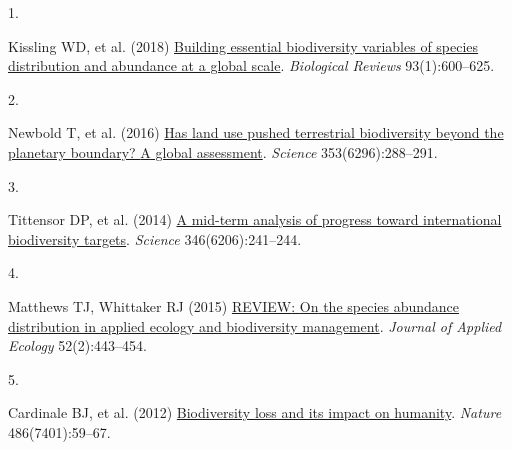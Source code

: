 \documentclass[9pt,twocolumn,twoside,]{pnas-new}
\newlength{\cslhangindent}
\newlength{\csllabelwidth}
\newenvironment{CSLReferences}[2] %
 {\begin{list}{}{%
  \setlength{\itemindent}{0pt}
  \setlength{\leftmargin}{0pt}
  \setlength{\parsep}{0pt}
  \ifodd #1
   \setlength{\leftmargin}{\cslhangindent}
   \setlength{\itemindent}{-1\cslhangindent}
  \fi
  \setlength{\itemsep}{#2\baselineskip}}}
 {\end{list}}
\newcommand{\CSLLeftMargin}[1]{\parbox[t]{\csllabelwidth}{#1}}
\newcommand{\CSLRightInline}[1]{\parbox[t]{\linewidth - \csllabelwidth}{#1}\break}
\begin{document}
\pnasbreak

\label{refs}
\begin{CSLReferences}{0}{1}
\CSLLeftMargin{1. }%
\CSLRightInline{Kissling WD, et al. (2018)
\href{https://doi.org/10.1111/brv.12359}{Building essential biodiversity
variables of species distribution and abundance at a global scale}.
\emph{Biological Reviews} 93(1):600--625.}

\CSLLeftMargin{2. }%
\CSLRightInline{Newbold T, et al. (2016)
\href{https://doi.org/10.1126/science.aaf2201}{Has land use pushed
terrestrial biodiversity beyond the planetary boundary? {A} global
assessment}. \emph{Science} 353(6296):288--291.}

\CSLLeftMargin{3. }%
\CSLRightInline{Tittensor DP, et al. (2014)
\href{https://doi.org/10.1126/science.1257484}{A mid-term analysis of
progress toward international biodiversity targets}. \emph{Science}
346(6206):241--244.}

\CSLLeftMargin{4. }%
\CSLRightInline{Matthews TJ, Whittaker RJ (2015)
\href{https://doi.org/10.1111/1365-2664.12380}{{REVIEW}: {On} the
species abundance distribution in applied ecology and biodiversity
management}. \emph{Journal of Applied Ecology} 52(2):443--454.}

\CSLLeftMargin{5. }%
\CSLRightInline{Cardinale BJ, et al. (2012)
\href{https://doi.org/10.1038/nature11148}{Biodiversity loss and its
impact on humanity}. \emph{Nature} 486(7401):59--67.}

\end{CSLReferences}



% 
\end{document}
